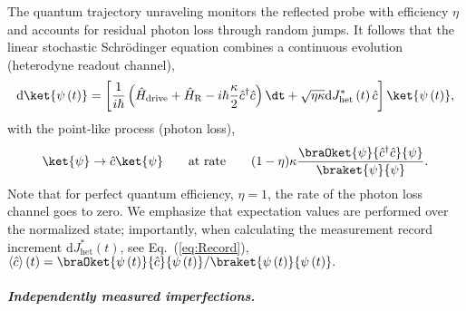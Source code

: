 The quantum trajectory unraveling monitors the reflected probe with
efficiency $\eta$ and accounts for residual photon loss through random
jumps. It follows that the linear stochastic Schrödinger equation
combines a continuous evolution (heterodyne readout channel), 
\begin{equation}
{\rm d}\ket{\psi\left(t\right)}=\left[\frac{1}{i\hbar}\left(\hat{H}_{{\rm drive}}+\hat{H}_{{\rm R}}-i\hbar\frac{\kappa}{2}\hat{c}^{\dagger}\hat{c}\right)\dt+\sqrt{\eta\kappa}\mathrm{d}J_{\mathrm{het}}^{*}\left(t\right)\hat{c}\right]\ket{\psi\left(t\right)},\label{eqn:SSE_continuous}
\end{equation}
with the point-like process (photon loss), 
\begin{equation}
\ket{\psi}\to\hat{c}\ket{\psi}\qquad\text{at rate}\qquad(1-\eta)\kappa\frac{\braOket{\psi}{\hat{c}^{\dagger}\hat{c}}{\psi}}{\braket{\psi}{\psi}}.
\end{equation}
Note that for perfect quantum efficiency, $\eta=1$, the rate of the
photon loss channel goes to zero. We emphasize that expectation values
are performed over the normalized state; importantly, when calculating
the measurement record increment $\mathrm{d}J_{\mathrm{het}}^{*}\left(t\right)$,
see Eq.~(\ref{eq:Record}), $\left\langle \hat{c}\right\rangle \left(t\right)=\braOket{\psi\left(t\right)}{\hat{c}}{\psi\left(t\right)}/\braket{\psi\left(t\right)}{\psi\left(t\right)}.$

\paragraph{\textit{\emph{Independently measured imperfections.}}\emph{ }}

